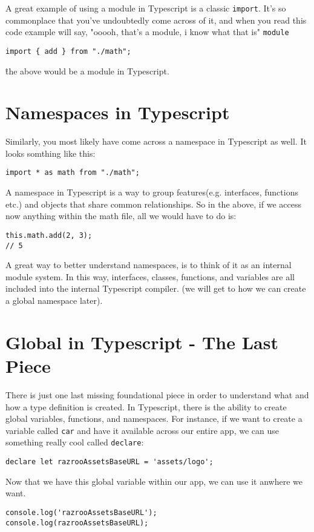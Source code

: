 A great example of using a module in Typescript is a classic \lstinline{import}. It's so commonplace that you've undoubtedly come across of it, and when you read this code example will say, "ooooh, that's a module, i know what that is" \lstinline{module}
\begin{lstlisting}
import { add } from "./math";
\end{lstlisting}

\^ the above would be a module in Typescript.

\section{Namespaces in Typescript}
Similarly, you most likely have come across a namespace in Typescript as well. It looks somthing like this:
\begin{lstlisting}
import * as math from "./math";
\end{lstlisting}
A namespace in Typescript is a way to group features(e.g. interfaces, functions etc.) and objects that share common relationships. So in the above, if we access now anything within the math file, all we would have to do is:
\begin{verbatim}
this.math.add(2, 3);
// 5  
\end{verbatim}

A great way to better understand namespaces, is to think of it as an internal module system. In this way, interfaces, classes, functions, and variables are all included into the internal Typescript compiler. (we will get to how we can create a global namespace later).

\section{Global in Typescript - The Last Piece}
There is just one last missing foundational piece in order to understand what and how a type definition is created. In Typescript, there is the ability to 
create global variables, functions, and namespaces. For instance, if we want to create a variable called \lstinline{car} and have it available across our entire app, we can use something really cool called \lstinline{declare}: 

\begin{verbatim}
declare let razrooAssetsBaseURL = 'assets/logo';  
\end{verbatim}

Now that we have this global variable within our app, we can use it anwhere we want. 
\begin{lstlisting}[caption=useless.component.ts]
console.log('razrooAssetsBaseURL');
console.log(razrooAssetsBaseURL);
\end{lstlisting}

